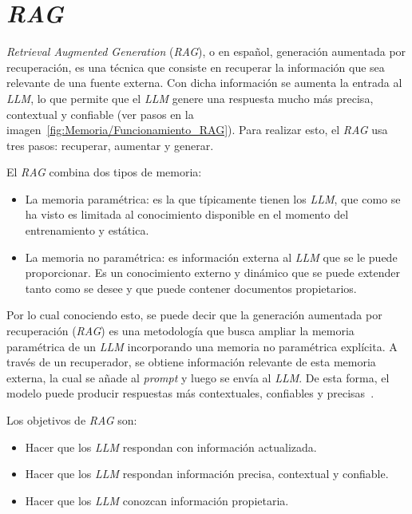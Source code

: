 \section{\textit{RAG}}
\textit{Retrieval Augmented Generation} (\textit{RAG}), o en español, generación aumentada por recuperación, es una técnica que consiste en recuperar la información que sea relevante de una fuente externa. Con dicha información se aumenta la entrada al \textit{LLM}, lo que permite que el \textit{LLM} genere una respuesta mucho más precisa, contextual y confiable (ver pasos en la imagen~\ref{fig:Memoria/Funcionamiento_RAG}). Para realizar esto, el \textit{RAG} usa tres pasos: recuperar, aumentar y generar. 


El \textit{RAG} combina dos tipos de memoria:
\begin{itemize}
\tightlist
	\item La memoria paramétrica: es la que típicamente tienen los \textit{LLM}, que como se ha visto es limitada al conocimiento disponible en el momento del entrenamiento y estática. 
	\item La memoria no paramétrica: es información externa al \textit{LLM} que se le puede proporcionar. Es un conocimiento externo y dinámico que se puede extender tanto como se desee y que puede contener documentos propietarios.
\end{itemize}

Por lo cual conociendo esto, se puede decir que la generación aumentada por recuperación (\textit{RAG}) es una metodología que busca ampliar la memoria paramétrica de un \textit{LLM} incorporando una memoria no paramétrica explícita. A través de un recuperador, se obtiene información relevante de esta memoria externa, la cual se añade al \textit{prompt} y luego se envía al \textit{LLM}. De esta forma, el modelo puede producir respuestas más contextuales, confiables y precisas~\cite{book:RAG_SimpleGuide}.

Los objetivos de \textit{RAG} son:
\begin{itemize}
\tightlist
	\item Hacer que los \textit{LLM} respondan con información actualizada.
	\item Hacer que los \textit{LLM} respondan información precisa, contextual y confiable.
	\item Hacer que los \textit{LLM} conozcan información propietaria.
\end{itemize}

